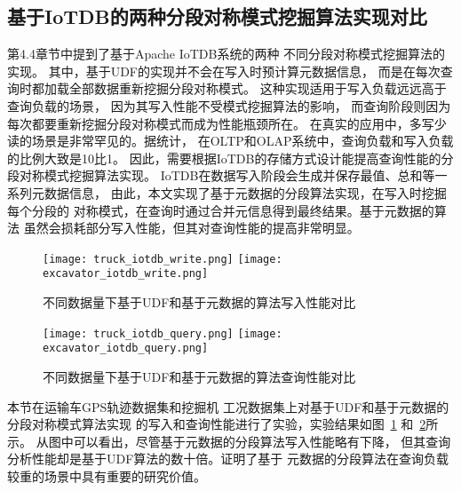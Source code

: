 \subsection{基于IoTDB的两种分段对称模式挖掘算法实现对比}
第4.4章节中提到了基于Apache IoTDB系统的两种
不同分段对称模式挖掘算法的实现。
其中，基于UDF的实现并不会在写入时预计算元数据信息，
而是在每次查询时都加载全部数据重新挖掘分段对称模式。
这种实现适用于写入负载远远高于查询负载的场景，
因为其写入性能不受模式挖掘算法的影响，
而查询阶段则因为每次都要重新挖掘分段对称模式而成为性能瓶颈所在。
在真实的应用中，多写少读的场景是非常罕见的。据统计，
在OLTP和OLAP系统中，查询负载和写入负载的比例大致是10比1。
因此，需要根据IoTDB的存储方式设计能提高查询性能的分段对称模式挖掘算法实现。
IoTDB在数据写入阶段会生成并保存最值、总和等一系列元数据信息，
由此，本文实现了基于元数据的分段算法实现，在写入时挖掘每个分段的
对称模式，在查询时通过合并元信息得到最终结果。基于元数据的算法
虽然会损耗部分写入性能，但其对查询性能的提高非常明显。

\begin{figure}
  \centering
  {\texttt{[image: truck\_iotdb\_write.png]}}
  {\texttt{[image: excavator\_iotdb\_write.png]}}
  \caption{不同数据量下基于UDF和基于元数据的算法写入性能对比}
  \label{fig:iotdb_write}
\end{figure}

\begin{figure}
\centering
{}
{\texttt{[image: truck\_iotdb\_query.png]}}
{\texttt{[image: excavator\_iotdb\_query.png]}}
\caption{不同数据量下基于UDF和基于元数据的算法查询性能对比}
\label{fig:iotdb_query}
\end{figure}

本节在运输车GPS轨迹数据集和挖掘机
工况数据集上对基于UDF和基于元数据的分段对称模式算法实现
的写入和查询性能进行了实验，实验结果如图~\ref{fig:iotdb_write}
和~\ref{fig:iotdb_query}所示。
从图中可以看出，尽管基于元数据的分段算法写入性能略有下降，
但其查询分析性能却是基于UDF算法的数十倍。证明了基于
元数据的分段算法在查询负载较重的场景中具有重要的研究价值。


